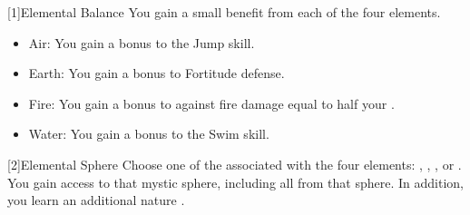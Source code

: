         [1]{Elemental Balance} You gain a small benefit from each of the four elements.
        \begin{itemize}
            \item Air: You gain a  bonus to the Jump skill.
            \item Earth: You gain a  bonus to Fortitude defense.
            \item Fire: You gain a bonus to  against fire damage equal to half your .
            \item Water: You gain a  bonus to the Swim skill.
        \end{itemize}

        [2]{Elemental Sphere} Choose one of the  associated with the four elements: , , , or .
        You gain access to that mystic sphere, including all  from that sphere.
        In addition, you learn an additional nature .

